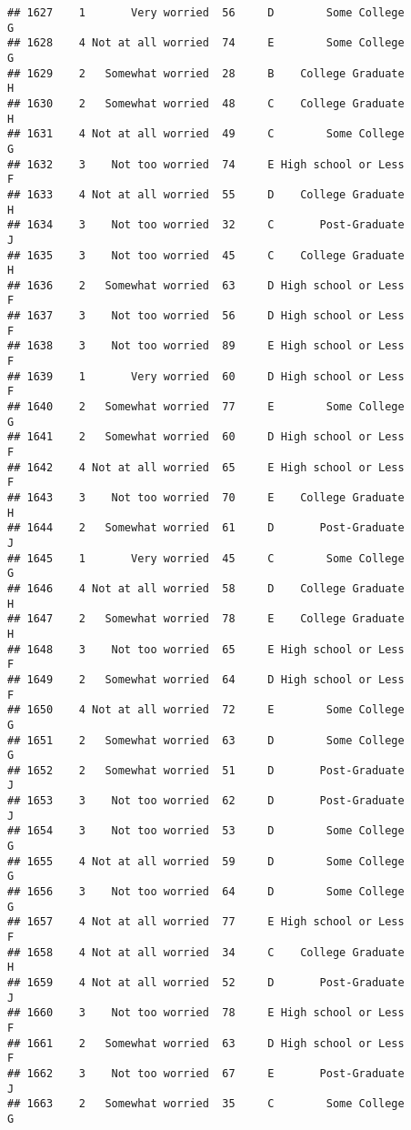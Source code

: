 \documentclass[
]{article}
\begin{document}
\begin{verbatim}
## 1627    1       Very worried  56     D        Some College         G
## 1628    4 Not at all worried  74     E        Some College         G
## 1629    2   Somewhat worried  28     B    College Graduate         H
## 1630    2   Somewhat worried  48     C    College Graduate         H
## 1631    4 Not at all worried  49     C        Some College         G
## 1632    3    Not too worried  74     E High school or Less         F
## 1633    4 Not at all worried  55     D    College Graduate         H
## 1634    3    Not too worried  32     C       Post-Graduate         J
## 1635    3    Not too worried  45     C    College Graduate         H
## 1636    2   Somewhat worried  63     D High school or Less         F
## 1637    3    Not too worried  56     D High school or Less         F
## 1638    3    Not too worried  89     E High school or Less         F
## 1639    1       Very worried  60     D High school or Less         F
## 1640    2   Somewhat worried  77     E        Some College         G
## 1641    2   Somewhat worried  60     D High school or Less         F
## 1642    4 Not at all worried  65     E High school or Less         F
## 1643    3    Not too worried  70     E    College Graduate         H
## 1644    2   Somewhat worried  61     D       Post-Graduate         J
## 1645    1       Very worried  45     C        Some College         G
## 1646    4 Not at all worried  58     D    College Graduate         H
## 1647    2   Somewhat worried  78     E    College Graduate         H
## 1648    3    Not too worried  65     E High school or Less         F
## 1649    2   Somewhat worried  64     D High school or Less         F
## 1650    4 Not at all worried  72     E        Some College         G
## 1651    2   Somewhat worried  63     D        Some College         G
## 1652    2   Somewhat worried  51     D       Post-Graduate         J
## 1653    3    Not too worried  62     D       Post-Graduate         J
## 1654    3    Not too worried  53     D        Some College         G
## 1655    4 Not at all worried  59     D        Some College         G
## 1656    3    Not too worried  64     D        Some College         G
## 1657    4 Not at all worried  77     E High school or Less         F
## 1658    4 Not at all worried  34     C    College Graduate         H
## 1659    4 Not at all worried  52     D       Post-Graduate         J
## 1660    3    Not too worried  78     E High school or Less         F
## 1661    2   Somewhat worried  63     D High school or Less         F
## 1662    3    Not too worried  67     E       Post-Graduate         J
## 1663    2   Somewhat worried  35     C        Some College         G

\end{verbatim}
\end{document}
